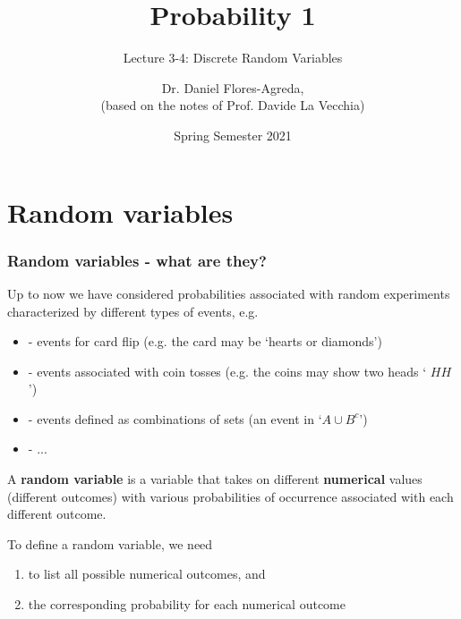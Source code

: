 \documentclass[notes=show,smaller,handout]{beamer}\usepackage[]{graphicx}\usepackage[]{color}
\newenvironment{stepenumerate}{\begin{enumerate}[<+->]}{\end{enumerate}}
\newenvironment{stepitemize}{\begin{itemize}[<+->]}{\end{itemize} }
\begin{document}
\title[S110015]{Probability 1}
\subtitle{Lecture 3-4: Discrete Random Variables}
\author[Flores-Agreda, La Vecchia]{Dr. Daniel Flores-Agreda, \\[0.5em] \tiny{(based on the notes of Prof. Davide La Vecchia)}}
\date{Spring Semester 2021}

\begin{frame}
\titlepage
\end{frame}

\section{Random variables}

\begin{frame}

\frametitle{Random variables - what are they?}

Up to now we have considered probabilities associated with random
experiments characterized by different types of events, e.g.

\vspace{0.4cm}

\begin{stepitemize}
\item[-] events for card flip (e.g. the card may be `hearts or diamonds')

\item[-] events associated with coin tosses (e.g. the coins may show two heads `%
$HH$')

\item[-] events defined as combinations of sets (an event in `$A\cup B^{c}$')
\item[-]...
\end{stepitemize}

\begin{definition}

A \textbf{random variable} is a variable that takes on different
\textbf{numerical} values (different outcomes) with various probabilities of
occurrence associated with each different outcome. \\
\vspace{0.4cm}
\end{definition}

To define a random variable, we need

\begin{stepenumerate}
\item to list all possible numerical outcomes, and

\item the corresponding probability for each numerical outcome
\end{stepenumerate}


\end{frame}%
\end{document}
